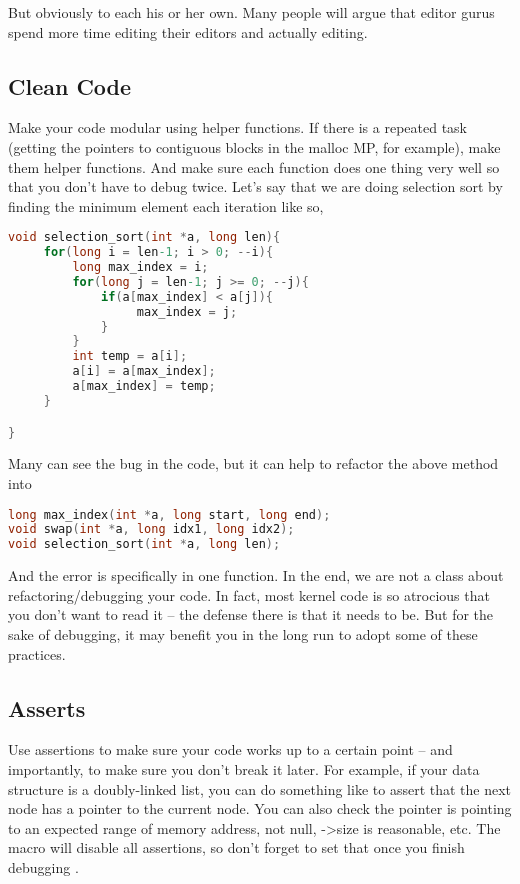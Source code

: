 But obviously to each his or her own.
Many people will argue that editor gurus spend more time editing their editors and actually editing.

\subsection{Clean Code}

Make your code modular using helper functions. If there is a repeated task (getting the pointers to contiguous blocks in the malloc MP, for example), make them helper functions.
And make sure each function does one thing very well so that you don't have to debug twice.
Let's say that we are doing selection sort by finding the minimum element each iteration like so,

\begin{lstlisting}[language=C]
void selection_sort(int *a, long len){
     for(long i = len-1; i > 0; --i){
         long max_index = i;
         for(long j = len-1; j >= 0; --j){
             if(a[max_index] < a[j]){
                  max_index = j;
             }
         }
         int temp = a[i];
         a[i] = a[max_index];
         a[max_index] = temp;
     }

}
\end{lstlisting}

Many can see the bug in the code, but it can help to refactor the above method into

\begin{lstlisting}[language=C]
long max_index(int *a, long start, long end);
void swap(int *a, long idx1, long idx2);
void selection_sort(int *a, long len);
\end{lstlisting}

And the error is specifically in one function.
In the end, we are not a class about refactoring/debugging your code.
In fact, most kernel code is so atrocious that you don't want to read it -- the defense there is that it needs to be.
But for the sake of debugging, it may benefit you in the long run to adopt some of these practices.

\subsection{Asserts}

Use assertions to make sure your code works up to a certain point -- and importantly, to make sure you don't break it later.
For example, if your data structure is a doubly-linked list, you can do something like  to assert that the next node has a pointer to the current node.
You can also check the pointer is pointing to an expected range of memory address, not null, -\textgreater{}size is reasonable, etc.
The  macro will disable all assertions, so don't forget to set that once you finish debugging \cite{cplusplus_assert}.

